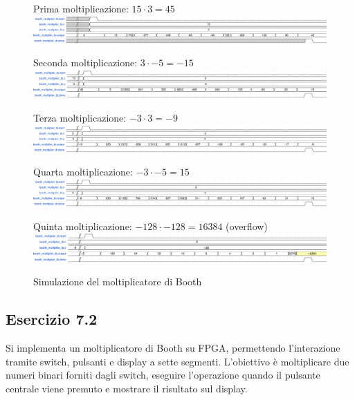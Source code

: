 \begin{figure}[h]
    \centering
    Prima moltiplicazione: $15 \cdot 3 = 45$
    \includegraphics[width=\linewidth]{img/booth_multiplier_tb_1.pdf}
    \medskip

    Seconda moltiplicazione: $3 \cdot -5 = -15$
    \includegraphics[width=\linewidth]{img/booth_multiplier_tb_2.pdf}
    \medskip

    Terza moltiplicazione: $-3 \cdot 3 = -9$
    \includegraphics[width=\linewidth]{img/booth_multiplier_tb_3.pdf}
    \medskip

    Quarta moltiplicazione: $-3 \cdot -5 = 15$
    \includegraphics[width=\linewidth]{img/booth_multiplier_tb_4.pdf}
    \medskip

    Quinta moltiplicazione: $-128 \cdot -128 = 16384$ (overflow)
    \includegraphics[width=\linewidth]{img/booth_multiplier_tb_5.pdf}
    \caption{Simulazione del moltiplicatore di Booth}
    \label{fig:booth_multiplier_tb}
\end{figure}

\subsection{Esercizio 7.2}
Si implementa un moltiplicatore di Booth su FPGA, permettendo l'interazione tramite switch, pulsanti e display a sette segmenti. L'obiettivo è moltiplicare due numeri binari forniti dagli switch, eseguire l'operazione quando il pulsante centrale viene premuto e mostrare il risultato sul display.

\begin{code}
    \inputminted{vhdl}{vhdl/booth_multiplier_onboard.vhd}
    \caption{Implementazione del moltiplicatore di Booth su board}
    \label{cod:booth_multiplier_onboard}
\end{code}

